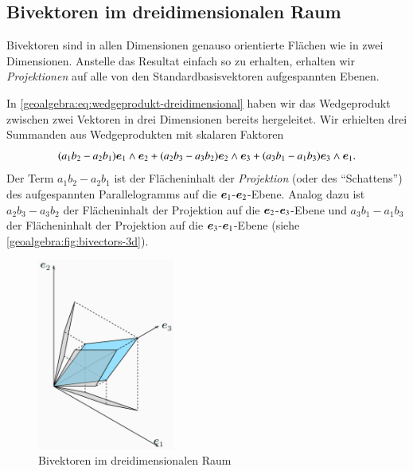 \subsection{Bivektoren im dreidimensionalen Raum}
Bivektoren sind in allen Dimensionen genauso orientierte Flächen wie in zwei Dimensionen.
Anstelle das Resultat einfach so zu erhalten, erhalten wir \emph{Projektionen}
auf alle von den Standardbasisvektoren aufgespannten Ebenen.

In \eqref{geoalgebra:eq:wedgeprodukt-dreidimensional} haben wir das Wedgeprodukt zwischen zwei Vektoren
in drei Dimensionen bereits hergeleitet. Wir erhielten drei Summanden aus Wedgeprodukten mit skalaren Faktoren
\begin{equation*}
(a_1 b_2 - a_2 b_1) \eone \wedge \etwo 
  +(a_2 b_3 - a_3 b_2) \etwo \wedge \ethree 
  +(a_3 b_1 - a_1 b_3) \ethree \wedge \eone.
\end{equation*}
Der Term $a_1 b_2 - a_2 b_1$ ist der Flächeninhalt der \emph{Projektion} (oder des ``Schattens'') des aufgespannten Parallelogramms auf die $\eone$-$\etwo$-Ebene.
Analog dazu ist $a_2 b_3 - a_3 b_2$ der Flächeninhalt der Projektion auf die $\etwo$-$\ethree$-Ebene und $a_3 b_1 - a_1 b_3$ der Flächeninhalt
der Projektion auf die $\ethree$-$\eone$-Ebene (siehe \autoref{geoalgebra:fig:bivectors-3d}).

\begin{figure}
  \centering
  \includegraphics[width=0.4\textwidth]{papers/geoalgebra/assets/bivectors-3d.png}
  \caption{Bivektoren im dreidimensionalen Raum}
  \label{geoalgebra:fig:bivectors-3d}
\end{figure}

